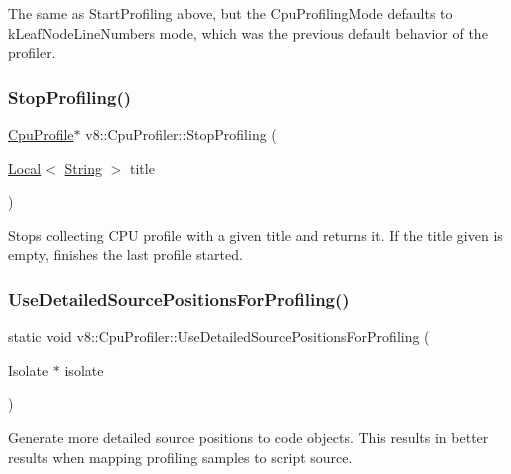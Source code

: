The same as Start\+Profiling above, but the Cpu\+Profiling\+Mode defaults to k\+Leaf\+Node\+Line\+Numbers mode, which was the previous default behavior of the profiler. \mbox{\label{classv8_1_1CpuProfiler_a34acaa3b0e40cf2f92e9e6acb3fb5de7}} 
\subsubsection{\texorpdfstring{Stop\+Profiling()}{StopProfiling()}}
{\footnotesize\ttfamily \mbox{\hyperlink{classv8_1_1CpuProfile}{Cpu\+Profile}}$\ast$ v8\+::\+Cpu\+Profiler\+::\+Stop\+Profiling (\begin{DoxyParamCaption}\item[{\mbox{\hyperlink{classv8_1_1Local}{Local}}$<$ \mbox{\hyperlink{classv8_1_1String}{String}} $>$}]{title }\end{DoxyParamCaption})}

Stops collecting C\+PU profile with a given title and returns it. If the title given is empty, finishes the last profile started. \mbox{\label{classv8_1_1CpuProfiler_ae62325c49592ebdc030fbcf21e470c16}} 
\subsubsection{\texorpdfstring{Use\+Detailed\+Source\+Positions\+For\+Profiling()}{UseDetailedSourcePositionsForProfiling()}}
{\footnotesize\ttfamily static void v8\+::\+Cpu\+Profiler\+::\+Use\+Detailed\+Source\+Positions\+For\+Profiling (\begin{DoxyParamCaption}\item[{Isolate $\ast$}]{isolate }\end{DoxyParamCaption})\hspace{0.3cm}{\ttfamily [static]}}

Generate more detailed source positions to code objects. This results in better results when mapping profiling samples to script source. \mbox{\label{classv8_1_1CpuProfiler_a8ddea26e13e631875cb41dcb2563ff40}} 
